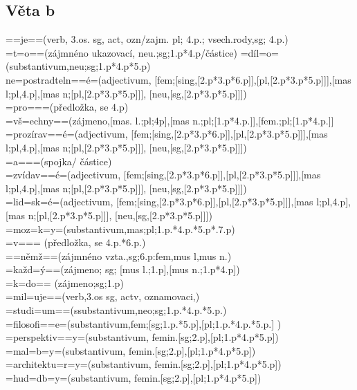 \documentclass[12pt,a4paper]{article}
\theoremstyle{definition}
\begin{document}
\subsection{V\v{e}ta b}
==je==(verb, 3.os. sg, act, ozn/zajm. pl; 4.p.; vsech.rody,sg; 4.p.) \\
=t=o==(z\'{a}jmn\'{e}no ukazovac\'{i}, neu.;sg;1.p*4.p/\v{c}\'{a}stice) 
=d\'{i}l=o=(substantivum,neu;sg;1.p*4.p*5.p) \\
ne=postradteln==\'{e}=(adjectivum, [fem;[sing,[2.p*3.p*6.p]],[pl,[2.p*3.p*5.p]]],[mas l;pl,4.p],[mas n;[pl,[2.p*3.p*5.p]]], [neu,[sg,[2.p*3.p*5.p]]])\\
=pro===(p\v{r}edlo\v{z}ka, se 4.p)\\
=v\v{s}=echny==(z\'{a}jmeno,[mas. l.;pl;4p],[mas n.;pl;[1.p*4.p.]],[fem.;pl;[1.p*4.p.]] \\
=proz\'{i}rav==\'{e}=(adjectivum, [fem;[sing,[2.p*3.p*6.p]],[pl,[2.p*3.p*5.p]]],[mas l;pl,4.p],[mas n;[pl,[2.p*3.p*5.p]]], [neu,[sg,[2.p*3.p*5.p]]])\\
=a===(spojka/ \v{c}\'{a}stice) \\
=zv\'{i}dav==\'{e}=(adjectivum, [fem;[sing,[2.p*3.p*6.p]],[pl,[2.p*3.p*5.p]]],[mas l;pl,4.p],[mas n;[pl,[2.p*3.p*5.p]]], [neu,[sg,[2.p*3.p*5.p]]])\\
=lid=sk=\'{e}=(adjectivum, [fem;[sing,[2.p*3.p*6.p]],[pl,[2.p*3.p*5.p]]],[mas l;pl,4.p],[mas n;[pl,[2.p*3.p*5.p]]], [neu,[sg,[2.p*3.p*5.p]]])\\
=moz=k=y=(substantivum,mas;pl;1.p.*4.p.*5.p*.7.p) \\
=v=== (p\v{r}edlo\v{z}ka, se 4.p.*6.p.) \\
==n\v{e}m\v{z}==(z\'{a}jmn\'{e}no  vzta.,sg;6.p:fem,mus l,mus n.) \\
=ka\v{z}d=\'{y}==(z\'{a}jmeno; sg; [mus l.;1.p],[mus n.;1.p*4.p]) \\
=k=do== (z\'{a}jmeno;sg;1.p) \\
=mil=uje==(verb,3.os sg, actv, oznamovaci,) \\
=studi=um==(ssubstantivum,neo;sg;1.p.*4.p.*5.p.) \\
=filosofi==e=(substantivum,fem;[sg;1.p.*5.p],[pl;1.p.*4.p.*5.p.] )\\
=perspektiv==y=(substantivum, femin.[sg;2.p],[pl;1.p*4.p*5.p])\\
=mal=b=y=(substantivum, femin.[sg;2.p],[pl;1.p*4.p*5.p])\\ 
=architektu=r=y=(substantivum, femin.[sg;2.p],[pl;1.p*4.p*5.p])\\
=hud=db=y=(substantivum, femin.[sg;2.p],[pl;1.p*4.p*5.p])\\
\end{document}
